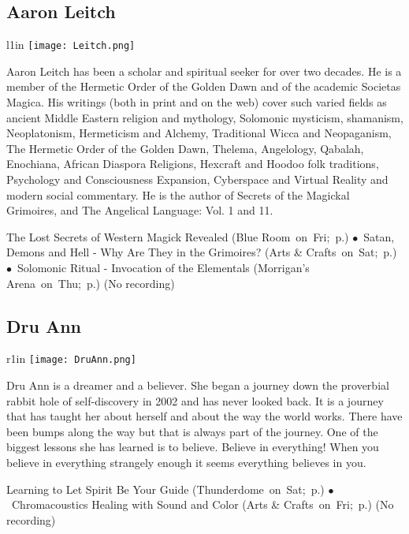 \subsection{Aaron Leitch} 

\begingroup
 \begin{wrapfigure}{l}{1in}
  \texttt{[image: Leitch.png]} %
  \end{wrapfigure}

{ Aaron Leitch has been a scholar and spiritual seeker for over two decades. He is a member of the Hermetic Order of the Golden Dawn and of the academic Societas Magica. His writings (both in print and on the web) cover such varied fields as ancient Middle Eastern religion and mythology, Solomonic mysticism, shamanism, Neoplatonism, Hermeticism and Alchemy, Traditional Wicca and Neopaganism, The Hermetic Order of the Golden Dawn, Thelema, Angelology, Qabalah, Enochiana, African Diaspora Religions, Hexcraft and Hoodoo folk traditions, Psychology and Consciousness Expansion, Cyberspace and Virtual Reality and modern social commentary. He is the author of Secrets of the Magickal Grimoires, and The Angelical Language: Vol. 1 and 11. 

} \hspace{2em} {\footnotesize The Lost Secrets of Western Magick Revealed (Blue Room~on~Fri;~p.\pageref{Fri-Leitch2}) $\bullet$~Satan, Demons and Hell - Why Are They in the Grimoires? (Arts \& Crafts~on~Sat;~p.\pageref{Sat-Leitch3}) $\bullet$~Solomonic Ritual - Invocation of the Elementals (Morrigan's Arena~on~Thu;~p.\pageref{Thu-Leitch1})}
 {\small (No recording)} 


\endgroup

\vspace{6pt}
\subsection{Dru Ann} 

\begingroup
 \begin{wrapfigure}{r}{1in}
  \texttt{[image: DruAnn.png]} %
  \end{wrapfigure}

{ Dru Ann is a dreamer and a believer. She began a journey down the proverbial rabbit hole of
self-discovery in 2002 and has never looked back. It is a journey that has taught her about
herself and about the way the world works. There have been bumps along the way but that is
always part of the journey. One of the biggest lessons she has learned is to believe. Believe in
everything! When you believe in everything strangely enough it seems everything believes in
you. 

} \hspace{2em} {\footnotesize Learning to Let Spirit Be Your Guide (Thunderdome~on~Sat;~p.\pageref{Sat-DruAnn3}) $\bullet$~Chromacoustics Healing with Sound and Color (Arts \& Crafts~on~Fri;~p.\pageref{Fri-DruAnn2})}
 {\small (No recording)} 


